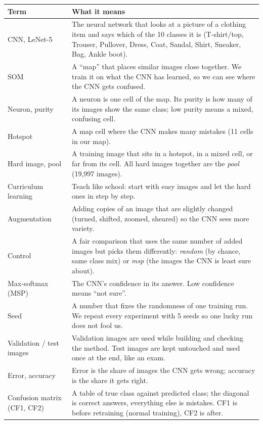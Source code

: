 \documentclass[11pt]{article}
\begin{document}
\renewcommand{\arraystretch}{1.12}
{\small
\begin{tabularx}{\textwidth}{|>{\raggedright\arraybackslash}p{}|X|}
\hline
\textbf{Term} & \textbf{What it means} \\ \hline
CNN, LeNet-5 & The neural network that looks at a picture of a clothing item and says which of the 10 classes it is (T-shirt/top, Trouser, Pullover, Dress, Coat, Sandal, Shirt, Sneaker, Bag, Ankle boot). \\ \hline
SOM & A ``map'' that places similar images close together. We train it on what the CNN has learned, so we can see where the CNN gets confused. \\ \hline
Neuron, purity & A neuron is one cell of the map. Its purity is how many of its images show the same class; low purity means a mixed, confusing cell. \\ \hline
Hotspot & A map cell where the CNN makes many mistakes (11 cells in our map). \\ \hline
Hard image, pool & A training image that sits in a hotspot, in a mixed cell, or far from its cell. All hard images together are the \emph{pool} (19{,}997 images). \\ \hline
Curriculum learning & Teach like school: start with easy images and let the hard ones in step by step. \\ \hline
Augmentation & Adding copies of an image that are slightly changed (turned, shifted, zoomed, sheared) so the CNN sees more variety. \\ \hline
Control & A fair comparison that uses the same number of added images but picks them differently: \emph{random} (by chance, same class mix) or \emph{msp} (the images the CNN is least sure about). \\ \hline
Max-softmax (MSP) & The CNN's confidence in its answer. Low confidence means ``not sure''. \\ \hline
Seed & A number that fixes the randomness of one training run. We repeat every experiment with 5 seeds so one lucky run does not fool us. \\ \hline
Validation / test images & Validation images are used while building and checking the method. Test images are kept untouched and used once at the end, like an exam. \\ \hline
Error, accuracy & Error is the share of images the CNN gets wrong; accuracy is the share it gets right. \\ \hline
Confusion matrix (CF1, CF2) & A table of true class against predicted class; the diagonal is correct answers, everything else is mistakes. CF1 is before retraining (normal training), CF2 is after. \\ \hline

\end{tabularx}}
\end{document}
